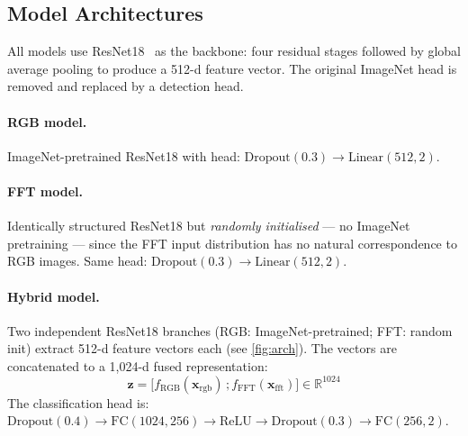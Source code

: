 \subsection{Model Architectures}
\label{sec:models}

All models use ResNet18~\cite{he2016resnet} as the backbone: four residual
stages followed by global average pooling to produce a 512-d feature vector.
The original ImageNet head is removed and replaced by a detection head.

\paragraph{RGB model.}
ImageNet-pretrained ResNet18 with head:
$\text{Dropout}(0.3) \to \text{Linear}(512, 2)$.

\paragraph{FFT model.}
Identically structured ResNet18 but \emph{randomly initialised} — no
ImageNet pretraining — since the FFT input distribution has no natural
correspondence to RGB images.
Same head: $\text{Dropout}(0.3) \to \text{Linear}(512, 2)$.

\paragraph{Hybrid model.}
Two independent ResNet18 branches (RGB: ImageNet-pretrained; FFT: random
init) extract 512-d feature vectors each (see \cref{fig:arch}).
The vectors are concatenated to a 1{,}024-d fused representation:
\begin{equation}
  \mathbf{z} =
    \bigl[ f_{\text{RGB}}(\mathbf{x}_{\text{rgb}})\,;
           f_{\text{FFT}}(\mathbf{x}_{\text{fft}}) \bigr]
    \in \mathbb{R}^{1024}
  \label{eq:fusion}
\end{equation}
The classification head is:
$\text{Dropout}(0.4) \to \text{FC}(1024,256) \to \text{ReLU}
 \to \text{Dropout}(0.3) \to \text{FC}(256,2)$.

